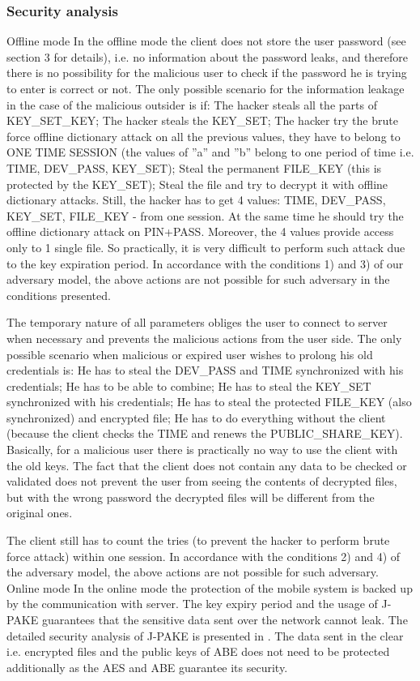 \documentclass[twocolumn]{svjour3}          %
\begin{document}
\subsubsection{Security analysis}
\label{sec_sec_analysis}
Offline mode
In the offline mode the client does not store the user password (see section 3 for details), i.e. no information about the password leaks, and therefore there is no possibility for the malicious user to check if the password he is trying to enter is correct or not. The only possible scenario for the information leakage in the case of the malicious outsider is if:
The hacker steals all the parts of KEY\_SET\_KEY;
The hacker steals the KEY\_SET;
The hacker try the brute force offline dictionary attack on all the previous values, they have to belong to ONE TIME SESSION (the values of ”a” and ”b” belong to one period of time i.e. TIME, DEV\_PASS, KEY\_SET);
Steal the permanent FILE\_KEY (this is protected by the KEY\_SET);
Steal the file and try to decrypt it with offline dictionary attacks.
        Still, the hacker has to get 4 values: TIME, DEV\_PASS, KEY\_SET, FILE\_KEY - from one session. At the same time he should try the offline dictionary attack on PIN+PASS. Moreover, the 4 values provide access only to 1 single file. So practically, it is very difficult to perform such attack due to the key expiration period. In accordance with the conditions 1) and 3) of our adversary model, the above actions are not possible for such adversary in the conditions presented.

The temporary nature of all parameters obliges the user to connect to server when necessary and prevents the malicious actions from the user side. The only possible scenario when malicious or expired user wishes to prolong his old credentials is:
He has to steal the DEV\_PASS and TIME synchronized with his credentials;
He has to be able to combine;
He has to steal the KEY\_SET synchronized with his credentials;
He has to steal the protected FILE\_KEY (also synchronized) and encrypted file;
He has to do everything without the client (because the client checks the TIME and renews the PUBLIC\_SHARE\_KEY).
Basically, for a malicious user there is practically no way to use the client with the old keys. The fact that the client does not contain any data to be checked or validated does not prevent the user from seeing the contents of decrypted files, but with the wrong password the decrypted files will be different from the original ones.

The client still has to count the tries (to prevent the hacker to perform brute force attack) within one session. In accordance with the conditions 2) and 4) of the adversary model, the above actions are not possible for such adversary.
Online mode
In the online mode the protection of the mobile system is backed up by the communication with server. The key expiry period and the usage of J-PAKE \cite{hao2010j,hao2008password} guarantees that the sensitive data sent over the network cannot leak. The detailed security analysis of J-PAKE is presented in \cite{toorani2014security}. The data sent in the clear i.e. encrypted files and the public keys of ABE does not need to be protected additionally as the AES and ABE guarantee its security.
\end{document}
